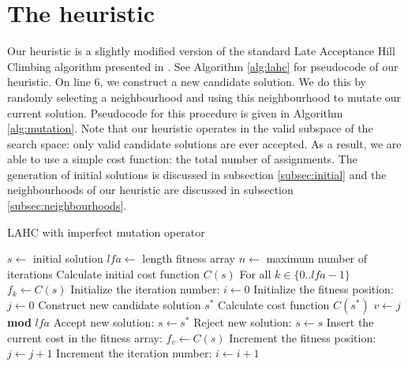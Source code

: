 \documentclass[]{article}
\begin{document}
\section{The heuristic}
Our heuristic is a slightly modified version of the standard Late Acceptance Hill Climbing algorithm presented in \cite{burke2012late}. See Algorithm \ref{alg:lahc} for pseudocode of our heuristic. On line 6, we construct a new candidate solution. We do this by randomly selecting a neighbourhood and using this neighbourhood to mutate our current solution. Pseudocode for this procedure is given in Algorithm \ref{alg:mutation}. Note that our heuristic operates in the valid subspace of the search space: only valid candidate solutions are ever accepted. As a result, we are able to use a simple cost function: the total number of assignments.
The generation of initial solutions is discussed in subsection \ref{subsec:initial} and the neighbourhoods of our heuristic are discussed in subsection \ref{subsec:neighbourhoods}.

\begin{algorithm}                      %
	\caption{LAHC with imperfect mutation operator}%
	\label{alg:lahc}                           %
	\begin{algorithmic}[1]                    %
		\REQUIRE $s \leftarrow$ initial solution
		\REQUIRE $lfa \leftarrow$ length fitness array
		\REQUIRE $n \leftarrow$ maximum number of iterations
		\STATE Calculate initial cost function $C(s)$
		\STATE For all $k \in \{0..lfa-1\}$ $f_k \leftarrow C(s)$
		\STATE Initialize the iteration number: $i \leftarrow 0$
		\STATE Initialize the fitness position: $j \leftarrow 0$
		\STATE Construct new candidate solution $s^*$
			\STATE Calculate cost function $C(s^*)$
			\STATE $v \leftarrow j$ \textbf{mod} $lfa$
				\STATE Accept new solution: $s \leftarrow s^*$
			\ELSE
				\STATE Reject new solution: $s \leftarrow s$
			\ENDIF
			\STATE Insert the current cost in the fitness array: $f_v \leftarrow C(s)$
			\STATE Increment the fitness position: $j \leftarrow j+1$
		\ENDIF
		\STATE Increment the iteration number: $i \leftarrow i+1$
		\ENDWHILE
	\end{algorithmic}
\end{algorithm}
\end{document}
